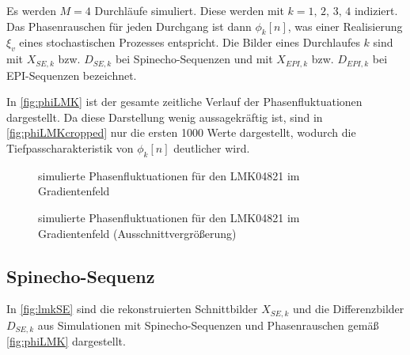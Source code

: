 Es werden $M=4$ Durchläufe simuliert. Diese werden mit $k=1,\,2,\,3,\,4$ indiziert. Das Phasenrauschen für jeden Durchgang ist dann $\phi_k[n]$, was einer Realisierung $\xi_v$ eines stochastischen Prozesses entspricht. Die Bilder eines Durchlaufes $k$ sind mit $X_{SE,k}$ bzw. $D_{SE,k}$ bei Spinecho-Sequenzen und mit $X_{EPI,k}$ bzw. $D_{EPI,k}$ bei EPI-Sequenzen bezeichnet.

In \autoref{fig:phiLMK} ist der gesamte zeitliche Verlauf der Phasenfluktuationen dargestellt. Da diese Darstellung wenig aussagekräftig ist, sind in \autoref{fig:phiLMKcropped} nur die ersten 1000 Werte dargestellt, wodurch die Tiefpasscharakteristik von $\phi_k[n]$ deutlicher wird.

\begin{figure}[H]
	\centering
	\caption[simulierte Phasenfluktuationen (LMK04821 in Gradientenfeld)]{simulierte Phasenfluktuationen für den LMK04821 im Gradientenfeld}
	\label{fig:phiLMK}
\end{figure}

\begin{figure}[H]
	\centering
	\caption[simulierte Phasenfluktuationen (LMK04821 in Gradientenfeld) (Vergrößerung)]{simulierte Phasenfluktuationen für den LMK04821 im Gradientenfeld (Ausschnittvergrößerung)}
	\label{fig:phiLMKcropped}
\end{figure}

\clearpage
\subsection{Spinecho-Sequenz}
In \autoref{fig:lmkSE} sind die rekonstruierten Schnittbilder $X_{SE,k}$ und die Differenzbilder $D_{SE,k}$ aus Simulationen mit Spinecho-Sequenzen und Phasenrauschen gemäß \autoref{fig:phiLMK} dargestellt.

